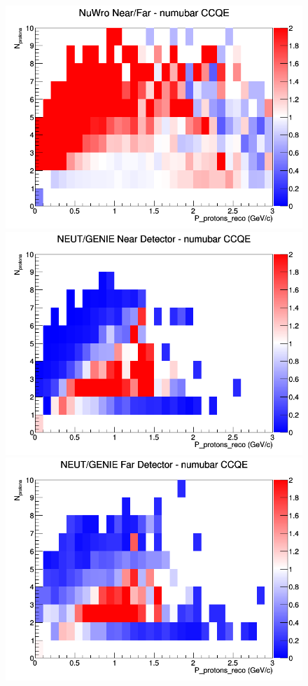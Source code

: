 \begin{figure}[h]
\endminipage
{}
\includegraphics[width=\linewidth]{eff_N_P/GAr/protons/ratios/CCQE_NuWro_numubar_NF_N_P.png}
\endminipage
\newline
{}
\includegraphics[width=\linewidth]{eff_N_P/GAr/protons/ratios/CCQE_NEUT_GENIE_numubar_near_N_P.png}
\endminipage
{}
\includegraphics[width=\linewidth]{eff_N_P/GAr/protons/ratios/CCQE_NEUT_GENIE_numubar_far_N_P.png}

\end{figure}
